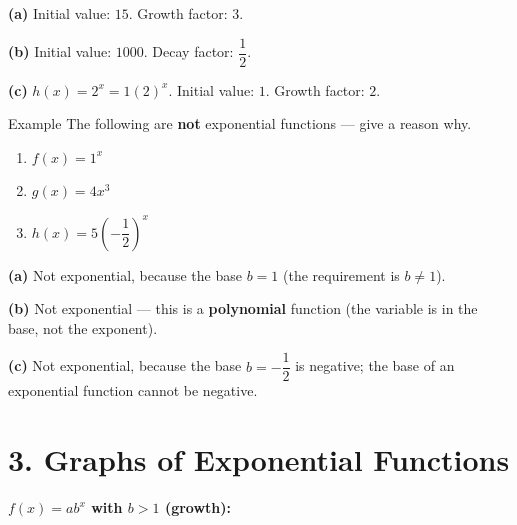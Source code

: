 \documentclass[12pt]{article}
\newcounter{examplenum}
\newenvironment{friendlyex}{%
    \refstepcounter{examplenum}%
    \begin{friendlyexbox}{Example \theexamplenum}%
}{%
    \end{friendlyexbox}%
}
\begin{document}
\begin{solutionbox}
\textbf{(a)} Initial value: $15$. \quad Growth factor: $3$.

\textbf{(b)} Initial value: $1000$. \quad Decay factor: $\dfrac12$.

\textbf{(c)} $h(x)=2^x=1(2)^x$. Initial value: $1$. \quad Growth factor: $2$.
\end{solutionbox}

\begin{friendlyex}{}
The following are \textbf{not} exponential functions --- give a reason why.
\begin{enumerate}[label=(\alph*)]
    \item $f(x)=1^x$
    \item $g(x)=4x^3$
    \item $h(x)=5\left(-\dfrac12\right)^x$
\end{enumerate}
\end{friendlyex}

\begin{solutionbox}
\textbf{(a)} Not exponential, because the base $b=1$ (the requirement is $b\neq 1$).

\textbf{(b)} Not exponential --- this is a \textbf{polynomial} function (the variable is in the base, not the exponent).

\textbf{(c)} Not exponential, because the base $b=-\dfrac12$ is negative; the base of an exponential function cannot be negative.
\end{solutionbox}

\section*{3. Graphs of Exponential Functions}

\textbf{$f(x)=ab^x$ with $b>1$ (growth):}

\begin{center}
\end{center}
\end{document}
